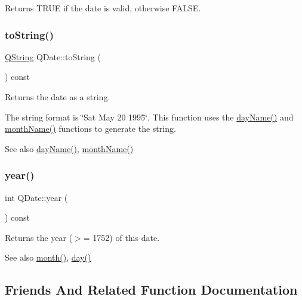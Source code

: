 Returns T\+R\+UE if the date is valid, otherwise F\+A\+L\+SE. \mbox{\label{class_q_date_aebc53b28c073570214cfc6f1376cbcd5}} 
\subsubsection{\texorpdfstring{toString()}{toString()}}
{\footnotesize\ttfamily \mbox{\hyperlink{class_q_string}{Q\+String}} Q\+Date\+::to\+String (\begin{DoxyParamCaption}{ }\end{DoxyParamCaption}) const}

Returns the date as a string.

The string format is \char`\"{}\+Sat May 20 1995\char`\"{}. This function uses the \mbox{\hyperlink{class_q_date_a08320176a833c05ff718155da1177381}{day\+Name()}} and \mbox{\hyperlink{class_q_date_afa5fcbf8ec6629175873dd50cbc3da4c}{month\+Name()}} functions to generate the string.

\begin{DoxySeeAlso}{See also}
\mbox{\hyperlink{class_q_date_a08320176a833c05ff718155da1177381}{day\+Name()}}, \mbox{\hyperlink{class_q_date_afa5fcbf8ec6629175873dd50cbc3da4c}{month\+Name()}} 
\end{DoxySeeAlso}
\mbox{\label{class_q_date_a7ad4fc16e91f089391a4ea9710076839}} 
\subsubsection{\texorpdfstring{year()}{year()}}
{\footnotesize\ttfamily int Q\+Date\+::year (\begin{DoxyParamCaption}{ }\end{DoxyParamCaption}) const}

Returns the year ($>$= 1752) of this date.

\begin{DoxySeeAlso}{See also}
\mbox{\hyperlink{class_q_date_a42aa3a5238c1dd81848e0bf690b3dce5}{month()}}, \mbox{\hyperlink{class_q_date_a4da6cc4ed155922c376d61102ffcb372}{day()}} 
\end{DoxySeeAlso}


\subsection{Friends And Related Function Documentation}
\mbox{\label{class_q_date_aebb24cfcc74a8440d7aff4d211276ab8}} 
